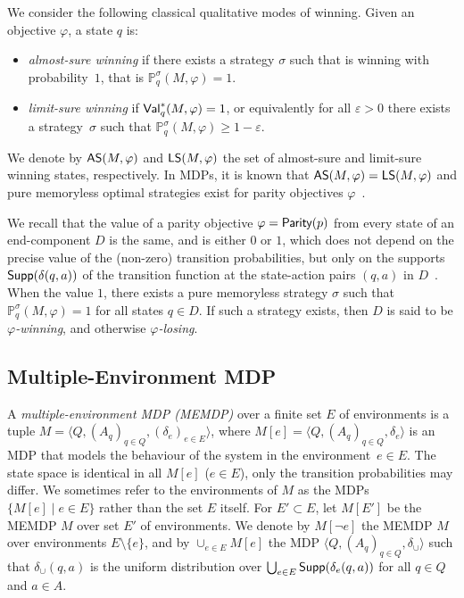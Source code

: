 \documentclass[a4paper,USenglish,cleveref, autoref, thm-restate]{lipics-v2021}
\let\epsilon\varepsilon
\newcommand{\tuple}[1]{\langle #1 \rangle}
\newcommand*{\pr}{\mathbb{P}}
\newcommand\Supp{\textrm{\sf Supp}}
\newcommand\almostsure{\textrm{\sf AS}}
\newcommand\limitsure{\textrm{\sf LS}}
\newcommand\Parity{\textrm{\sf Parity}}
\newcommand\Val{\ensuremath{{\textrm{\sf Val}}}}
\begin{document}
We consider the following classical qualitative modes of winning. 
Given an objective $\varphi$, a state $q$ is:
\begin{itemize}
 
\item \emph{almost-sure winning} if there exists a strategy $\sigma$ such that 
is winning with probability~$1$, that is $\pr_{q}^{\sigma}(M, \varphi) = 1$.

\item \emph{limit-sure winning} if $\Val_{q}^*(M,\varphi) = 1$, or equivalently for all $\epsilon > 0$
there exists a strategy~$\sigma$ such that $\pr_{q}^{\sigma}(M, \varphi) \geq 1-\epsilon$.
\end{itemize}

We denote by $\almostsure(M,\varphi)$ and $\limitsure(M,\varphi)$
the set of almost-sure and limit-sure winning states, respectively.
In MDPs, it is known that $\almostsure(M,\varphi) = \limitsure(M,\varphi)$ and pure memoryless optimal strategies exist for parity objectives $\varphi$~\cite{Puterman,CY-acm95}.


We recall that the value of a parity objective $\varphi = \Parity(p)$ 
from every state of an end-component $D$ is the same, and is either $0$ or $1$, 
which does not depend on the precise value of the (non-zero) transition probabilities, 
but only on the supports $\Supp(\delta(q,a))$ of the transition function 
at the state-action pairs $(q,a)$ in $D$~\cite{DeAlfaro-phd97}.
When the value $1$, there exists a pure memoryless strategy $\sigma$
such that $\pr_{q}^{\sigma}(M, \varphi) = 1$
for all states $q\in D$.
If such a strategy exists, then $D$ is said to be \emph{$\varphi$-winning}, and otherwise \emph{$\varphi$-losing}.



\subsection{Multiple-Environment MDP}
\label{section:memdp}
A \emph{multiple-environment MDP (MEMDP)} over a finite set $E$ of environments
is a tuple $M = \tuple{Q, (A_q)_{q \in Q}, (\delta_e)_{e \in E}}$,
where $M[e] = \tuple{Q,(A_q)_{q \in Q},\delta_e}$ is an MDP that models the
behaviour of the system in the environment~$e \in E$. 
The state space is identical in all $M[e]$ ($e \in E$), only the 
transition probabilities may differ.
We sometimes refer to the environments of $M$ as the MDPs $\{ M[e] \mid e \in E\}$
rather than the set $E$ itself.
For $E' \subset E$, let $M[E']$ be the MEMDP $M$ over set $E'$ of environments.
We denote by $M[\lnot e]$ the MEMDP $M$ over environments $E \setminus \{e\}$,
and by $\cup_{e \in E} M[e]$ the MDP $\tuple{Q, (A_q)_{q \in Q}, \delta_{\cup}}$
such that $\delta_{\cup}(q,a)$ is the uniform distribution over $\bigcup_{e \in E} 
\Supp(\delta_{e}(q,a))$ for all $q \in Q$ and $a \in A$.
\end{document}
